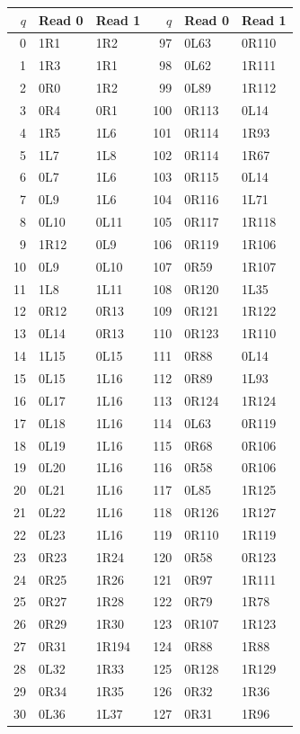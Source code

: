 {\small\ttfamily
\begin{longtable}{@{}rll@{\qquad}rll@{}}
\toprule $q$ & Read 0 & Read 1 & $q$ & Read 0 & Read 1\\\midrule\endhead
0 & 1R1 & 1R2 & 97 & 0L63 & 0R110\\
1 & 1R3 & 1R1 & 98 & 0L62 & 1R111\\
2 & 0R0 & 1R2 & 99 & 0L89 & 1R112\\
3 & 0R4 & 0R1 & 100 & 0R113 & 0L14\\
4 & 1R5 & 1L6 & 101 & 0R114 & 1R93\\
5 & 1L7 & 1L8 & 102 & 0R114 & 1R67\\
6 & 0L7 & 1L6 & 103 & 0R115 & 0L14\\
7 & 0L9 & 1L6 & 104 & 0R116 & 1L71\\
8 & 0L10 & 0L11 & 105 & 0R117 & 1R118\\
9 & 1R12 & 0L9 & 106 & 0R119 & 1R106\\
10 & 0L9 & 0L10 & 107 & 0R59 & 1R107\\
11 & 1L8 & 1L11 & 108 & 0R120 & 1L35\\
12 & 0R12 & 0R13 & 109 & 0R121 & 1R122\\
13 & 0L14 & 0R13 & 110 & 0R123 & 1R110\\
14 & 1L15 & 0L15 & 111 & 0R88 & 0L14\\
15 & 0L15 & 1L16 & 112 & 0R89 & 1L93\\
16 & 0L17 & 1L16 & 113 & 0R124 & 1R124\\
17 & 0L18 & 1L16 & 114 & 0L63 & 0R119\\
18 & 0L19 & 1L16 & 115 & 0R68 & 0R106\\
19 & 0L20 & 1L16 & 116 & 0R58 & 0R106\\
20 & 0L21 & 1L16 & 117 & 0L85 & 1R125\\
21 & 0L22 & 1L16 & 118 & 0R126 & 1R127\\
22 & 0L23 & 1L16 & 119 & 0R110 & 1R119\\
23 & 0R23 & 1R24 & 120 & 0R58 & 0R123\\
24 & 0R25 & 1R26 & 121 & 0R97 & 1R111\\
25 & 0R27 & 1R28 & 122 & 0R79 & 1R78\\
26 & 0R29 & 1R30 & 123 & 0R107 & 1R123\\
27 & 0R31 & 1R194 & 124 & 0R88 & 1R88\\
28 & 0L32 & 1R33 & 125 & 0R128 & 1R129\\
29 & 0R34 & 1R35 & 126 & 0R32 & 1R36\\
30 & 0L36 & 1L37 & 127 & 0R31 & 1R96\\

\end{longtable}}
